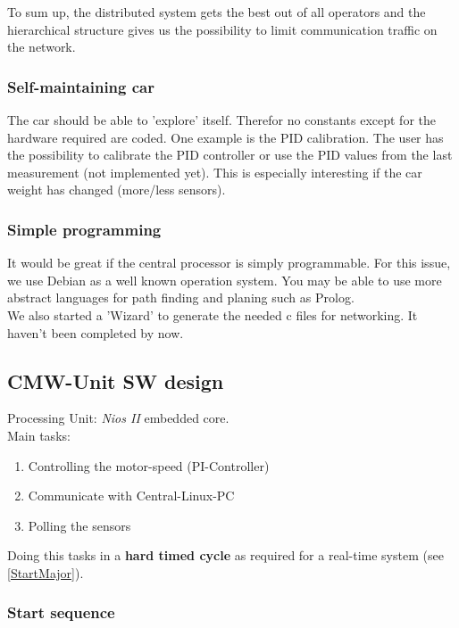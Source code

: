 To sum up, the distributed system gets the best out of all operators and the hierarchical structure gives us the possibility to limit communication traffic on the network.

\subsubsection{Self-maintaining car}

The car should be able to 'explore' itself. Therefor no constants except for the hardware required are coded. One example is the PID calibration. The user has the possibility to calibrate the PID controller or use the PID values from the last measurement (not implemented yet). This is especially interesting if the car weight has changed (more/less sensors).

\subsubsection{Simple programming}

It would be great if the central processor is simply programmable. For this issue, we use Debian as a well known operation system. You may be able to use more abstract languages for path finding and planing such as Prolog.\\

We also started a 'Wizard' to generate the needed c files for networking. It haven't been completed by now.

\subsection{CMW-Unit SW design} 

Processing Unit: \textsl{Nios II} embedded core.\\	
Main tasks:
\begin{enumerate}
	\item Controlling the motor-speed (PI-Controller)
	\item Communicate with Central-Linux-PC
	\item Polling the sensors
\end{enumerate}

Doing this tasks in a \textbf{hard timed cycle} as required for a real-time system (see \ref{StartMajor}).

\subsubsection{Start sequence}

